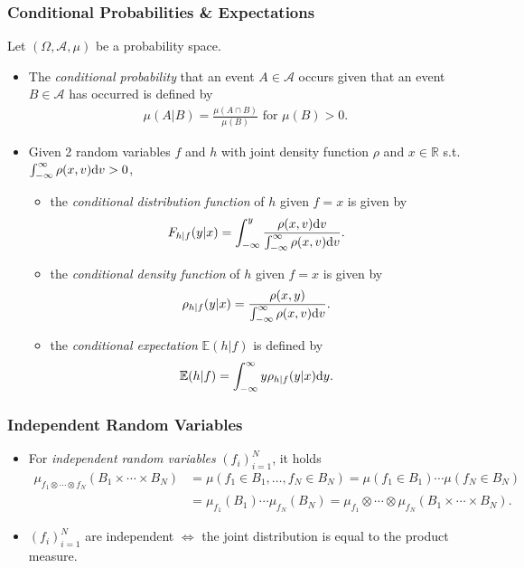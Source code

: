 \documentclass[oneside]{article}
\numberwithin{equation}{section}
\begin{document}
\subsubsection{Conditional Probabilities \& Expectations}
Let $(\Omega,\mathcal{A},\mu)$ be a probability space.
\begin{itemize}
    \item The \textit{conditional probability} that an event $A\in\mathcal{A}$ occurs given that an event $B\in\mathcal{A}$ has occurred is defined by
    \begin{align*}
        \mu(A|B) = \frac{\mu(A\cap B)}{\mu(B)} \mbox{ for } \mu(B) > 0.
    \end{align*}
    \item Given 2 random variables $f$ and $h$ with joint density function $\rho$ and $x\in\mathbb{R}$ s.t. $\int_{-\infty}^\infty \rho(x,v){\rm d}v > 0$,
    \begin{itemize}
        \item the \textit{conditional distribution function} of $h$ given $f = x$ is given by
        \begin{align*}
            F_{h|f}(y|x) = \int_{-\infty}^y \frac{\rho(x,v){\rm d}v}{\int_{-\infty}^\infty \rho(x,v){\rm d}v}.
        \end{align*}
        \item the \textit{conditional density function} of $h$ given $f = x$ is given by
        \begin{align*}
            \rho_{h|f}(y|x) = \frac{\rho(x,y)}{\int_{-\infty}^\infty \rho(x,v){\rm d}v}.
        \end{align*}
        \item the \textit{conditional expectation} $\mathbb{E}(h|f)$ is defined by
        \begin{align*}
            \mathbb{E}(h|f) = \int_{-\infty}^\infty y\rho_{h|f}(y|x){\rm d}y.
        \end{align*}
    \end{itemize}
\end{itemize}

\subsubsection{Independent Random Variables}
\begin{itemize}
    \item For \textit{independent random variables} $(f_i)_{i=1}^N$, it holds
    \begin{align*}
        \mu_{f_1\otimes\cdots\otimes f_N}(B_1\times\cdots\times B_N) &= \mu(f_1\in B_1,\ldots,f_N\in B_N) = \mu(f_1\in B_1)\cdots\mu(f_N\in B_N)\\
        &= \mu_{f_1}(B_1)\cdots\mu_{f_N}(B_N) = \mu_{f_1}\otimes\cdots\otimes\mu_{f_N}(B_1\times\cdots\times B_N).
    \end{align*}
    \item $(f_i)_{i=1}^N$ are independent $\Leftrightarrow$ the joint distribution is equal to the product measure.
\end{itemize}


\printbibliography[heading=bibintoc]
\end{document}
